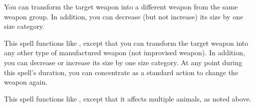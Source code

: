 \spelldur{\durmed}
\begin{spelleffect}
    You can transform the target weapon into a different weapon from the same weapon group. In addition, you can decrease (but not increase) its size by one size category.
\end{spelleffect}

\begin{spelleffect}
    This spell functions like , except that you can transform the target weapon into any other type of manufactured weapon (not improvised weapon). In addition, you can decrease or increase its size by one size category. At any point during this spell's duration, you can concentrate as a standard action to change the weapon again.
\end{spelleffect}

\spellrng{\rngmed}
\begin{spelleffect}
  This spell functions like , except that it affects multiple animals, as noted above.
\end{spelleffect}

\begin{comment}
\spellsection{Animate Objects}
\spelldesc{You imbue inanimate objects with mobility and a semblance of life.}
\spellschool{Transmutation (Animation)}
\spelllvl{Chaos 5, Trans 5}
\spellrng{\rngmed}
\spellarea{\areamed radius limit}
\spelltgts{One Small object/level within the area; see text}
\spelldur{\durshort}
\spelldef{None}
\spellsr{No}
\begin{spelleffect}
  Each animated object immediately attacks whomever or whatever you initially designate. Your control of the objects is limited to simple commands (``Attack,'' ``Defend,'' ``Stop,'' and so forth).
  \par An animated object can be of any nonmagical material. You may animate one Small or smaller object or an equivalent number of larger objects per caster level. A Medium object counts as two Small or smaller objects, a Large object as four, a Huge object as eight, a Gargantuan object as sixteen, and a Colossal object as thirty-two. You can give the objects new commands as a move action, as normal for directing an active spell.
\end{spelleffect}
\begin{spellnotes}
  This spell cannot animate objects carried or worn by a creature. This spell can be made permanent with a \spell{permanency} ritual.
\end{spellnotes}
\end{comment}


